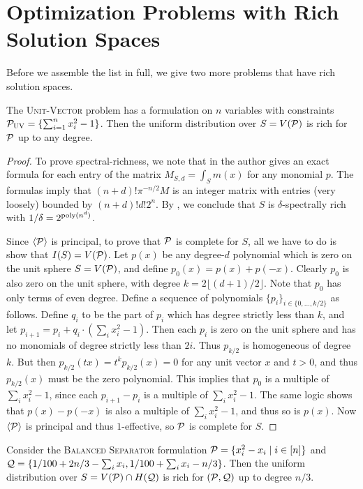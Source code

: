 \section{Optimization Problems with Rich Solution Spaces}
Before we assemble the list in full, we give two more problems that have rich solution spaces.
\begin{lemma}
The \textsc{Unit-Vector} problem has a formulation on $n$ variables with constraints $\mathcal P_{\textsc{UV}} = \{\sum_{i=1}^n x_i^2 - 1\}$. Then the uniform distribution over $S = V(\mathcal P)$ is rich for $\mathcal P$ up to any degree. 
\end{lemma}
\begin{proof}
To prove spectral-richness, we note that in \cite{Foll01} the author gives an exact formula for each entry of the matrix $M_{S,d} = \int_{S} m(x)$ for any monomial $p$. The formulas imply that $(n+d)!\pi^{-n/2} M$ is an integer matrix with entries (very loosely) bounded by $(n+d)!d!2^n$. By , we conclude that $S$ is $\delta$-spectrally rich with $1/\delta = 2^{\operatorname{poly}(n^d)}$.

Since $\langle \mathcal P \rangle$ is principal, to prove that $\mathcal P$ is complete for $S$, all we have to do is show that $I(S) = V(\mathcal P)$. Let $p(x)$ be any degree-$d$ polynomial which is zero on the unit sphere $S = V(\mathcal P)$, and define $p_0(x) = p(x) + p(-x)$. Clearly $p_0$ is also zero on the unit sphere, with degree $k = 2\lfloor (d+1)/2 \rfloor$. Note that $p_0$ has only terms of even degree. 
%
Define a sequence of polynomials $\{p_i\}_{i \in \{0,\ldots, k/2\}}$ as follows.
Define $q_i$ to be the part of $p_i$ which has degree strictly less than $k$, and let $p_{i+1} = p_i + q_i\cdot(\sum_i x_i^2 - 1)$. Then each $p_i$ is zero on the unit sphere and has no monomials of degree strictly less than $2i$. Thus $p_{k/2}$ is homogeneous of degree $k$. But then $p_{k/2}(tx) = t^kp_{k/2}(x) = 0$ for any unit vector $x$ and $t > 0$, and thus $p_{k/2}(x)$ must be the zero polynomial. This implies that $p_0$ is a multiple of $\sum_i x_i^2 - 1$, since each $p_{i+1} - p_i$ is a multiple of $\sum_i x_i^2 -1$. The same logic shows that $p(x) - p(-x)$ is also a multiple of $\sum_i x_i^2 - 1$, and thus so is $p(x)$. Now $\langle \mathcal P\rangle$ is principal and thus $1$-effective, so $\mathcal P$ is complete for $S$. 
\end{proof}
\begin{lemma}
Consider the \textsc{Balanced Separator} formulation $\mathcal P = \{x_i^2 - x_i\mid i \in [n]\}$ and $\mathcal Q = \{1/100 + 2n/3 - \sum_i x_i, 1/100 + \sum_i x_i - n/3\}$. Then the uniform distribution over $S = V(\mathcal P) \cap H(\mathcal Q)$ is rich for $(\mathcal P, \mathcal Q)$ up to degree $n/3$.
\end{lemma}

